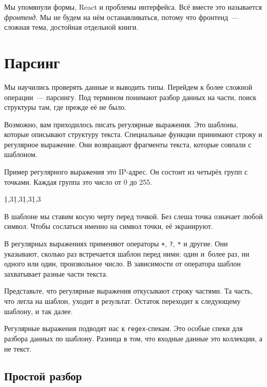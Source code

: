 
Мы упомянули формы, React и проблемы интерфейса. Всё вместе это называется
\emph{фронтенд}. Мы не будем на нём останавливаться, потому что фронтенд~---
сложная тема, достойная отдельной книги.

\section{Парсинг}

Мы научились проверять данные и выводить типы. Перейдем к более сложной
операции~--- парсингу. Под термином понимают разбор данных на части, поиск
структуры там, где прежде её не было.

Возможно, вам приходилось писать регулярные выражения. Это шаблоны, которые
описывают структуру текста. Специальные функции принимают строку и регулярное
выражение. Они возвращают фрагменты текста, которые совпали с шаблоном.

Пример регулярного выражения это IP-адрес. Он состоит из четырёх групп с
точками. Каждая группа это число от 0 до 255.


\begin{english}
  \begin{text}
\d{1,3}\.\d{1,3}\.\d{1,3}\.\d{1,3}
  \end{text}
\end{english}

В шаблоне мы ставим косую черту перед точкой. Без слеша точка означает любой
символ. Чтобы сослаться именно на символ точки, её экранируют.

В регулярных выражениях применяют операторы \verb|+|, \verb|?|, \verb|*| и
другие. Они указывают, сколько раз встречается шаблон перед ними: один и~более
раз, ни одного или один, произвольное число. В зависимости от оператора шаблон
захватывает разные части текста.

Представьте, что регулярные выражения откусывают строку частями. Та часть, что
легла на шаблон, уходит в результат. Остаток переходит к следующему шаблону, и
так далее.

Регулярные выражения подводят нас к \verb|regex|-спекам. Это особые спеки для
разбора данных по шаблону. Разница в том, что входные данные это коллекции, а не
текст.


\subsection{Простой разбор}

